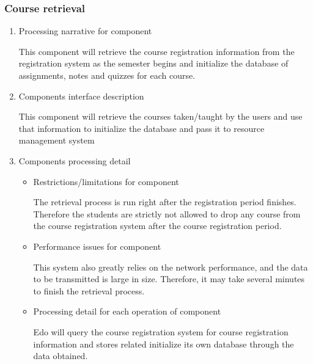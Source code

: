 \documentclass[paper=a4, fontsize=11pt]{scrartcl}
\numberwithin{equation}{section}		%
\numberwithin{figure}{section}			%
\numberwithin{table}{section}				%
\begin{document}
\subsubsection{Course retrieval}
\begin{enumerate}
	\item Processing narrative for component
	\par This component will retrieve the course registration information from the registration system as the semester begins and initialize the database of assignments, notes and quizzes for each course.
	\item Components interface description
	\par This component will retrieve the courses taken/taught by the users and use that information to initialize the database and pass it to resource management system
	\item Components processing detail
	\begin{itemize}
		\item Restrictions/limitations for component
		\par The retrieval process is run right after the registration period finishes. Therefore the students are strictly not allowed to drop any course from the course registration system after the course registration period. 
		\item Performance issues for component 
		\par This system also greatly relies on the network performance, and the data to be transmitted is large in size. Therefore, it may take several minutes to finish the retrieval process. 
		\item Processing detail for each operation of component 
		\par Edo will query the course registration system for course registration information and stores related initialize its own database through the data obtained.
	\end{itemize}
\end{enumerate}
\end{document}
